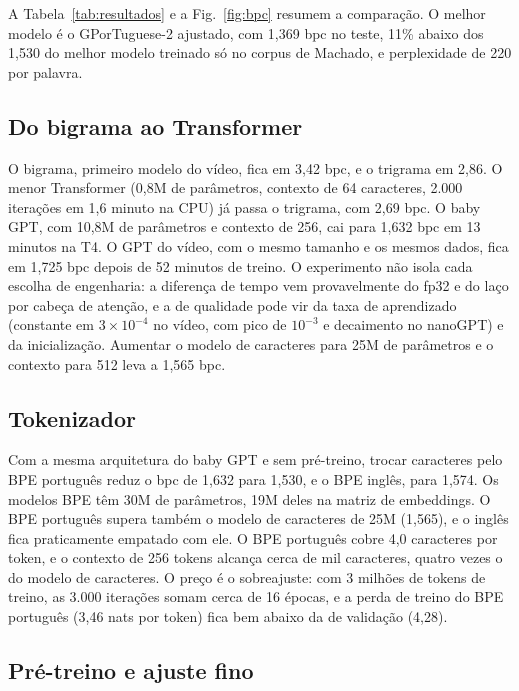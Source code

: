\documentclass[conference]{IEEEtran}
\begin{document}
A Tabela~\ref{tab:resultados} e a Fig.~\ref{fig:bpc} resumem a comparação. O melhor modelo é o GPorTuguese-2 ajustado, com 1,369 bpc no teste, 11\% abaixo dos 1,530 do melhor modelo treinado só no corpus de Machado, e perplexidade de 220 por palavra.

\subsection{Do bigrama ao Transformer}

O bigrama, primeiro modelo do vídeo, fica em 3,42 bpc, e o trigrama em 2,86. O menor Transformer (0,8M de parâmetros, contexto de 64 caracteres, 2.000 iterações em 1,6 minuto na CPU) já passa o trigrama, com 2,69 bpc. O baby GPT, com 10,8M de parâmetros e contexto de 256, cai para 1,632 bpc em 13 minutos na T4. O GPT do vídeo, com o mesmo tamanho e os mesmos dados, fica em 1,725 bpc depois de 52 minutos de treino. O experimento não isola cada escolha de engenharia: a diferença de tempo vem provavelmente do fp32 e do laço por cabeça de atenção, e a de qualidade pode vir da taxa de aprendizado (constante em $3\times10^{-4}$ no vídeo, com pico de $10^{-3}$ e decaimento no nanoGPT) e da inicialização. Aumentar o modelo de caracteres para 25M de parâmetros e o contexto para 512 leva a 1,565 bpc.

\subsection{Tokenizador}

Com a mesma arquitetura do baby GPT e sem pré-treino, trocar caracteres pelo BPE português reduz o bpc de 1,632 para 1,530, e o BPE inglês, para 1,574. Os modelos BPE têm 30M de parâmetros, 19M deles na matriz de embeddings. O BPE português supera também o modelo de caracteres de 25M (1,565), e o inglês fica praticamente empatado com ele. O BPE português cobre 4,0 caracteres por token, e o contexto de 256 tokens alcança cerca de mil caracteres, quatro vezes o do modelo de caracteres. O preço é o sobreajuste: com 3 milhões de tokens de treino, as 3.000 iterações somam cerca de 16 épocas, e a perda de treino do BPE português (3,46 nats por token) fica bem abaixo da de validação (4,28).

\subsection{Pré-treino e ajuste fino}
\end{document}
